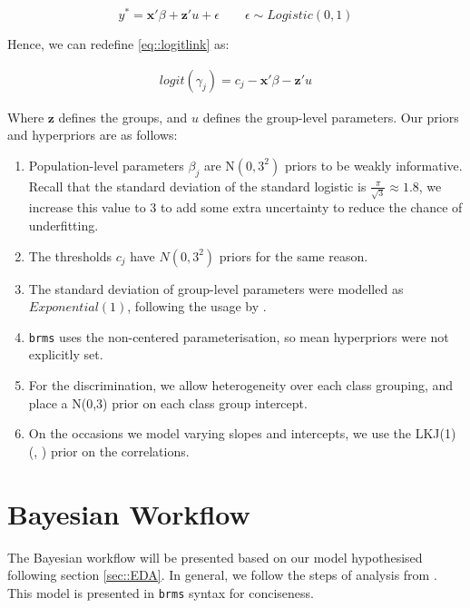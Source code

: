 \documentclass[11pt,twoside]{article}
\numberwithin{Theorem}{section}
\numberwithin{Definition}{section}
\numberwithin{Lemma}{section}
\numberwithin{Algorithm}{section}
\numberwithin{equation}{section}
\begin{document}
\begin{equation}
	y^*  = \mathbf{x'}\beta + \mathbf{z'}u + \epsilon \qquad \epsilon \sim Logistic(0, 1)
\end{equation}

Hence, we can redefine \eqref{eq::logitlink} as:

\begin{align}
logit(\gamma_j) = c_j - \mathbf{x'}\beta - \mathbf{z'}u
\end{align}



Where $\mathbf{z}$ defines the groups, and $u$ defines the group-level parameters. Our priors and hyperpriors are as follows:

\begin{enumerate}
	\item Population-level parameters $\beta_j$ are N$(0,3^2)$ priors to be weakly informative. Recall that the standard deviation of the standard logistic is $\frac{\pi}{\sqrt{3}} \approx 1.8$, we increase this value to 3 to add some extra uncertainty to reduce the chance of underfitting. 
	\item The thresholds $c_j$  have $N(0,3^2)$ priors for the same reason. 
	\item The standard deviation of group-level parameters were modelled as $Exponential(1)$, following the usage by \cite{McElreath_book}. 
	\item \texttt{brms} uses the non-centered parameterisation, so mean hyperpriors were not explicitly set. 
	\item For the discrimination, we allow heterogeneity over each class grouping, and place a N(0,3) prior on each class group intercept.
	\item On the occasions we model varying slopes and intercepts, we use the LKJ(1) (\citeauthor{LKJPrior}, \citeyear{LKJPrior}) prior on the correlations. 
\end{enumerate}



\newpage
\section{Bayesian Workflow} \label{sec::Workflow}

The Bayesian workflow will be presented based on our model hypothesised following section \ref{sec::EDA}. In general, we follow the steps of analysis from \cite{Gabry_Vis}. This model is presented in \texttt{brms} syntax for conciseness. 
\end{document}
